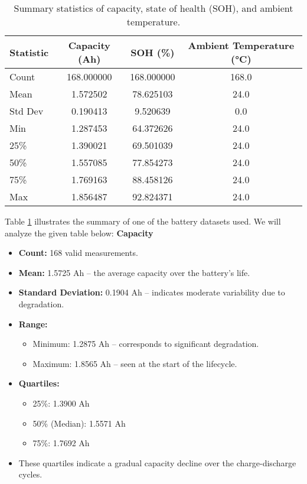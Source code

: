 \begin{table}[h!]
\centering
\begin{tabular}{lccc}
\toprule
\textbf{Statistic} & \textbf{Capacity (Ah)} & \textbf{SOH (\%)} & \textbf{Ambient Temperature (°C)} \\
\midrule
Count    & 168.000000 & 168.000000 & 168.0 \\
Mean     & 1.572502   & 78.625103  & 24.0  \\
Std Dev  & 0.190413   & 9.520639   & 0.0   \\
Min      & 1.287453   & 64.372626  & 24.0  \\
25\%     & 1.390021   & 69.501039  & 24.0  \\
50\%     & 1.557085   & 77.854273  & 24.0  \\
75\%     & 1.769163   & 88.458126  & 24.0  \\
Max      & 1.856487   & 92.824371  & 24.0  \\
\bottomrule
\end{tabular}
\caption{Summary statistics of capacity, state of health (SOH), and ambient temperature.}
\label{tab:summary_stats}
\end{table}

Table \ref{tab:summary_stats} illustrates the summary of one of the battery datasets used. We will analyze the given table below:
\textbf{Capacity}

\begin{itemize}
    \item \textbf{Count:} 168 valid measurements.
    \item \textbf{Mean:} 1.5725 Ah – the average capacity over the battery’s life.
    \item \textbf{Standard Deviation:} 0.1904 Ah – indicates moderate variability due to degradation.
    \item \textbf{Range:} 
    \begin{itemize}
        \item Minimum: 1.2875 Ah – corresponds to significant degradation.
        \item Maximum: 1.8565 Ah – seen at the start of the lifecycle.
    \end{itemize}
    \item \textbf{Quartiles:}
    \begin{itemize}
        \item 25\%: 1.3900 Ah
        \item 50\% (Median): 1.5571 Ah
        \item 75\%: 1.7692 Ah
    \end{itemize}
    \item These quartiles indicate a gradual capacity decline over the charge-discharge cycles.
\end{itemize}

